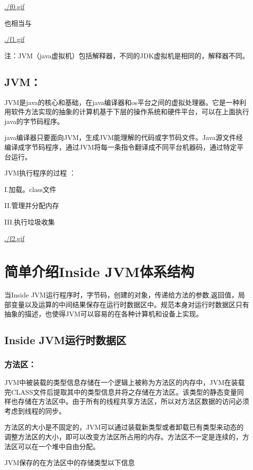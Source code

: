 \documentclass[10pt,b5paper]{article}
\begin{document}
\url{./f0.gif}

也相当与

\url{./f1.gif}

注：JVM（java虚拟机）包括解释器，不同的JDK虚拟机是相同的，解释器不同。
\subsection{JVM：}
\label{sec-2-2}

JVM是java的核心和基础，在java编译器和os平台之间的虚拟处理器。它是一种利用软件方法实现的抽象的计算机基于下层的操作系统和硬件平台，可以在上面执行java的字节码程序。

java编译器只要面向JVM，生成JVM能理解的代码或字节码文件。Java源文件经编译成字节码程序，通过JVM将每一条指令翻译成不同平台机器码，通过特定平台运行。

JVM执行程序的过程 ：

I.加载。class文件

II.管理并分配内存

III.执行垃圾收集

\url{./f2.gif}
\section{简单介绍Inside JVM体系结构}
\label{sec-3}
当Inside JVM运行程序时，字节码，创建的对象，传递给方法的参数,返回值，局部变量以及运算的中间结果保存在运行时数据区中。规范本身对运行时数据区只有抽象的描述，也使得JVM可以容易的在各种计算机和设备上实现。

\subsection{Inside JVM运行时数据区}
\label{sec-3-1}

\subsubsection{方法区：}
\label{sec-3-1-1}

JVM中被装载的类型信息存储在一个逻辑上被称为方法区的内存中，JVM在装载完CLASS文件后提取其中的类型信息并将之存储在方法区。该类型的静态变量同样也存储在方法区中。由于所有的线程共享方法区，所以对方法区数据的访问必须考虑到线程的同步。

方法区的大小是不固定的，JVM可以通过装载新类型或者卸载已有类型来动态的调整方法区的大小，即可以改变方法区所占用的内存。方法区不一定是连续的，方法区可以在一个堆中自由分配。

JVM保存的在方法区中的存储类型以下信息
\end{document}
